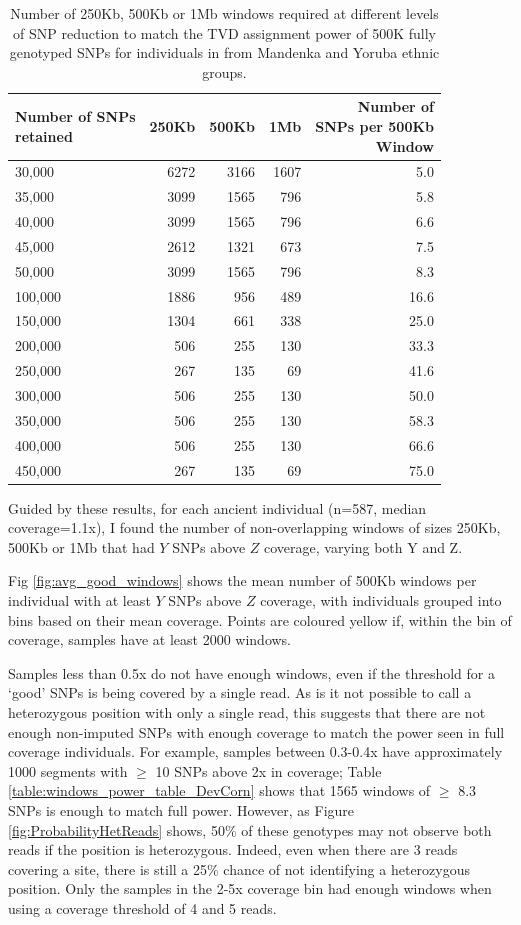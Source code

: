{\begin{table}
\centering
\begin{tabular}[t]{lrrrr}
\toprule
\thead{Number of SNPs\\ retained} & 250Kb & 500Kb & 1Mb & \thead{Number of\\ SNPs per 500Kb \\Window}\\
\midrule
30,000 & 6272 & 3166 & 1607 & 5.0\\
35,000 & 3099 & 1565 & 796 & 5.8\\
40,000 & 3099 & 1565 & 796 & 6.6\\
45,000 & 2612 & 1321 & 673 & 7.5\\
50,000 & 3099 & 1565 & 796 & 8.3\\
100,000 & 1886 & 956 & 489 & 16.6\\
150,000 & 1304 & 661 & 338 & 25.0\\
200,000 & 506 & 255 & 130 & 33.3\\
250,000 & 267 & 135 & 69 & 41.6\\
300,000 & 506 & 255 & 130 & 50.0\\
350,000 & 506 & 255 & 130 & 58.3\\
400,000 & 506 & 255 & 130 & 66.6\\
450,000 & 267 & 135 & 69 & 75.0\\
\bottomrule
\end{tabular}
\caption{Number of 250Kb, 500Kb or 1Mb windows required at different levels of SNP reduction to match the TVD assignment power of 500K fully genotyped SNPs for individuals in from Mandenka and Yoruba ethnic groups.}
\label{table:windows_power_table_ManYor}
\end{table}

Guided by these results, for each ancient individual (n=587, median coverage=1.1x), I found the number of non-overlapping windows of sizes 250Kb, 500Kb or 1Mb that had $Y$ SNPs above $Z$ coverage, varying both Y and Z. 

Fig \ref{fig:avg_good_windows} shows the mean number of 500Kb windows per individual with at least $Y$ SNPs above $Z$ coverage, with individuals grouped into bins based on their mean coverage. Points are coloured yellow if, within the bin of coverage, samples have at least 2000 windows.

Samples less than 0.5x do not have enough windows, even if the threshold for a `good' SNPs is being covered by a single read. As is it not possible to call a heterozygous position with only a single read, this suggests that there are not enough non-imputed SNPs with enough coverage to match the power seen in full coverage individuals. For example, samples between 0.3-0.4x have approximately 1000 segments with $\geq$ 10 SNPs above 2x in coverage; Table \ref{table:windows_power_table_DevCorn} shows that 1565 windows of $\geq$ 8.3 SNPs is enough to match full power. However, as Figure \ref{fig:ProbabilityHetReads} shows, 50\% of these genotypes may not observe both reads if the position is heterozygous. Indeed, even when there are 3 reads covering a site, there is still a 25\% chance of not identifying a heterozygous position. Only the samples in the 2-5x coverage bin had enough windows when using a coverage threshold of 4 and 5 reads. 

}

